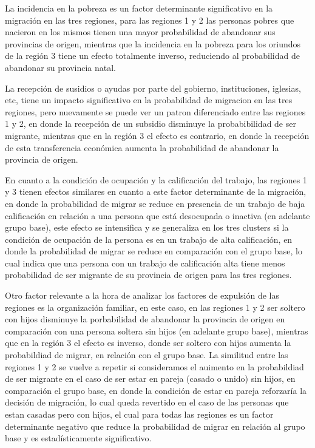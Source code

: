 \documentclass[12pt,a4paper]{article}
\begin{document}
La incidencia en la pobreza es un factor determinante significativo en la migración en las tres regiones, para las regiones 1 y 2 las personas pobres que nacieron en los mismos tienen una mayor probabilidad de abandonar sus provincias de origen, mientras que la incidencia en la pobreza para los oriundos de la región 3 tiene un efecto totalmente inverso, reduciendo al probabilidad de abandonar su provincia natal.

La recepción de susidios o ayudas por parte del gobierno, instituciones, iglesias, etc, tiene un impacto significativo en la probabilidad de migracion en las tres regiones, pero nuevamente se puede ver un patron diferenciado entre las regiones 1 y 2, en donde la recepción de un subsidio disminuye la probabibilidad de ser migrante, mientras que en la región 3 el efecto es contrario, en donde la recepción de esta transferencia económica aumenta la probabilidad de abandonar la provincia de origen.

En cuanto a la condición de ocupación y la calificación del trabajo, las regiones 1 y 3 tienen efectos similares en cuanto a este factor determinante de la migración, en donde la probabilidad de migrar se reduce en presencia de un trabajo de baja calificación en relación a una persona que está desocupada o inactiva (en adelante grupo base), este efecto se intensifica y se generaliza en los tres clusters si la condición de ocupación de la persona es en un trabajo de alta calificación, en donde la probabilidad de migrar se reduce en comparación con el grupo base, lo cual indica que una persona con un trabajo de calificación alta tiene menos probabilidad de ser migrante de su provincia de origen para las tres regiones.

Otro factor relevante a la hora de analizar los factores de expulsión de las regiones es la organización familiar, en este caso, en las regiones 1 y 2 ser soltero con hijos disminuye la porbabilidad de abandonar la provincia de origen en comparación con una persona soltera sin hijos (en adelante grupo base), mientras que en la región 3 el efecto es inverso, donde ser soltero con hijos aumenta la probabildiad de migrar, en relación con el grupo base.
La similitud entre las regiones 1 y 2 se vuelve a repetir si consideramos el auimento en la probabildiad de ser migrante en el caso de ser estar en pareja (casado o unido) sin hijos, en comparación el grupo base, en donde la condición de estar en pareja reforzaría la decisión de migración, lo cual queda revertido en el caso de las personas que estan casadas pero con hijos, el cual para todas las regiones es un factor determinante negativo que reduce la probabilidad de migrar en relación al grupo base y es estadísticamente significativo.
\end{document}
